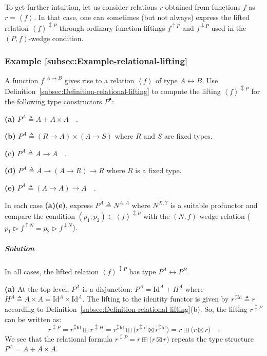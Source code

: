 To get further intuition, let us consider relations $r$ obtained
from functions $f$ as $r=\left<f\right>$. In that case, one can
sometimes (but not always) express the lifted relation $\left<f\right>^{\updownarrow P}$
through ordinary function liftings $f^{\uparrow P}$ and $f^{\downarrow P}$
used in the $\left(P,f\right)$-wedge condition.

\subsubsection{Example \label{subsec:Example-relational-lifting}\ref{subsec:Example-relational-lifting}}

A function $f^{:A\rightarrow B}$ gives rise to a relation $\left<f\right>$
of type $A\leftrightarrow B$. Use Definition~\ref{subsec:Definition-relational-lifting}
to compute the lifting $\left<f\right>^{\updownarrow P}$ for the
following type constructors $P^{\bullet}$:

\textbf{(a)} $P^{A}\triangleq A+A\times A\quad$.

\textbf{(b)} $P^{A}\triangleq(R\rightarrow A)\times(A\rightarrow S)$
where $R$ and $S$ are fixed types.

\textbf{(c)} $P^{A}\triangleq A\rightarrow A\quad$.

\textbf{(d)} $P^{A}\triangleq A\rightarrow\left(A\rightarrow R\right)\rightarrow R$
where $R$ is a fixed type.

\textbf{(e)} $P^{A}\triangleq\left(A\rightarrow A\right)\rightarrow A\quad$.

In each case \textbf{(a)}\textendash \textbf{(e)}, express $P^{A}\triangleq N^{A,A}$
where $N^{X,Y}$ is a suitable profunctor and compare the condition
$(p_{1},p_{2})\in\left<f\right>^{\updownarrow P}$ with the $\left(N,f\right)$-wedge
relation ($p_{1}\triangleright f^{\uparrow N}=p_{2}\triangleright f^{\downarrow N}$). 

\subparagraph{Solution}

In all cases, the lifted relation $\left<f\right>^{\updownarrow P}$
has type $P^{A}\leftrightarrow P^{B}$.

\textbf{(a)} At the top level, $P^{A}$ is a disjunction: $P^{A}=\text{Id}^{A}+H^{A}$
where $H^{A}\triangleq A\times A=\text{Id}^{A}\times\text{Id}^{A}$.
The lifting to the identity functor is given by $r^{\updownarrow\text{Id}}\triangleq r$
according to Definition~\ref{subsec:Definition-relational-lifting}(b).
So, the lifting $r^{\updownarrow P}$ can be written as:
\[
r^{\updownarrow P}=r^{\updownarrow\text{Id}}\boxplus r^{\updownarrow H}=r^{\updownarrow\text{Id}}\boxplus\big(r^{\updownarrow\text{Id}}\boxtimes r^{\updownarrow\text{Id}}\big)=r\boxplus\big(r\boxtimes r\big)\quad.
\]
We see that the relational formula $r^{\updownarrow P}=r\boxplus\big(r\boxtimes r\big)$
repeats the type structure $P^{A}=A+A\times A$.

